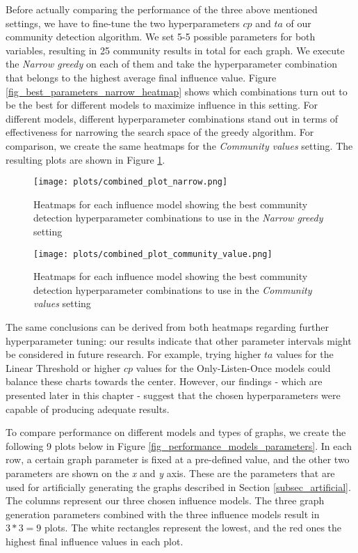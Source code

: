 \documentclass[pdflatex,sn-mathphys-ay]{sn-jnl}
\begin{document}
Before actually comparing the performance of the three above mentioned settings, we have to fine-tune the two hyperparameters $cp$ and $ta$ of our community detection algorithm. We set 5-5 possible parameters for both variables, resulting in 25 community results in total for each graph. We execute the \textit{Narrow greedy} on each of them and take the hyperparameter combination that belongs to the highest average final influence value. Figure \ref{fig_best_parameters_narrow_heatmap} shows which combinations turn out to be the best for different models to maximize influence in this setting. For different models, different hyperparameter combinations stand out in terms of effectiveness for narrowing the search space of the greedy algorithm. For comparison, we create the same heatmaps for the \textit{Community values} setting. The resulting plots are shown in Figure \ref{fig_best_parameters_community_value_heatmap}.

\begin{figure}[ht]
\centering
\texttt{[image: plots/combined\_plot\_narrow.png]}
\caption{Heatmaps for each influence model showing the best community detection hyperparameter combinations to use in the \textit{Narrow greedy} setting}
\label{fig_best_parameters_narrow_heatmap}
\vspace{7.5mm}
\texttt{[image: plots/combined\_plot\_community\_value.png]}
\caption{Heatmaps for each influence model showing the best community detection hyperparameter combinations to use in the \textit{Community values} setting}
\label{fig_best_parameters_community_value_heatmap}
\end{figure}

The same conclusions can be derived from both heatmaps regarding further hyperparameter tuning: our results indicate that other parameter intervals might be considered in future research. For example, trying higher $ta$ values for the Linear Threshold or higher $cp$ values for the Only-Listen-Once models could balance these charts towards the center. However, our findings - which are presented later in this chapter - suggest that the chosen hyperparameters were capable of producing adequate results.

To compare performance on different models and types of graphs, we create the following 9 plots below in Figure \ref{fig_performance_models_parameters}. In each row, a certain graph parameter is fixed at a pre-defined value, and the other two parameters are shown on the \textit{x} and \textit{y} axis. These are the parameters that are used for artificially generating the graphs described in Section \ref{subsec_artificial}. The columns represent our three chosen influence models. The three graph generation parameters combined with the three influence models result in $3*3=9$ plots. The white rectangles represent the lowest, and the red ones the highest final influence values in each plot.
\end{document}
